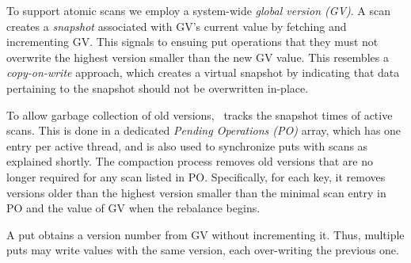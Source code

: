 
To support atomic scans we employ a system-wide \emph{global version (GV)}. 
A scan  creates a \emph{snapshot} associated with GV's current value by fetching and incrementing GV.
This signals to ensuing put operations that they must not overwrite the highest
version smaller than the new GV value.
This resembles a \emph{copy-on-write} approach, which  creates a virtual snapshot by 
indicating that data pertaining to the snapshot should not be overwritten in-place.  

To allow garbage collection of old versions, \sys\  tracks the snapshot times of active scans.
This is done in a dedicated  \emph{Pending Operations (PO)} array, which has one entry per active thread,
and is also used to synchronize puts with scans as explained shortly.
The compaction process 
removes old versions that are no longer required for any  
scan listed in PO. Specifically, for each key, it removes versions older than the highest version smaller than the minimal
scan entry in PO and the value of GV when the rebalance begins. 



A put obtains a version number from GV without incrementing it. Thus, multiple puts may write values with the same version, each over-writing the previous one. 

